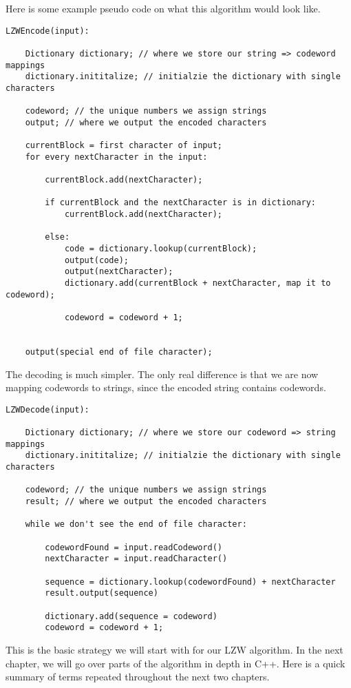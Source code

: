 \documentclass[12pt,twoside]{reedthesis}
\begin{document}
Here is some example pseudo code on what this algorithm would look like.
\begin{verbatim}
LZWEncode(input):

    Dictionary dictionary; // where we store our string => codeword mappings
    dictionary.inititalize; // initialzie the dictionary with single characters

    codeword; // the unique numbers we assign strings
    output; // where we output the encoded characters

    currentBlock = first character of input;
    for every nextCharacter in the input:

        currentBlock.add(nextCharacter);

        if currentBlock and the nextCharacter is in dictionary:
            currentBlock.add(nextCharacter);
            
        else:
            code = dictionary.lookup(currentBlock);
            output(code);
            output(nextCharacter);
            dictionary.add(currentBlock + nextCharacter, map it to codeword);

            codeword = codeword + 1;


    output(special end of file character);
\end{verbatim}
The decoding is much simpler. The only real difference is that we are now mapping codewords to strings, since the encoded string contains codewords.
\begin{verbatim}
LZWDecode(input):

    Dictionary dictionary; // where we store our codeword => string mappings
    dictionary.inititalize; // initialzie the dictionary with single characters

    codeword; // the unique numbers we assign strings
    result; // where we output the encoded characters

    while we don't see the end of file character:

        codewordFound = input.readCodeword()
        nextCharacter = input.readCharacter()

        sequence = dictionary.lookup(codewordFound) + nextCharacter
        result.output(sequence)

        dictionary.add(sequence = codeword)
        codeword = codeword + 1;
\end{verbatim}
This is the basic strategy we will start with for our LZW algorithm. In the next chapter, we will go over parts of the algorithm in depth in C++. Here is a quick summary of terms repeated throughout the next two chapters.
\end{document}
